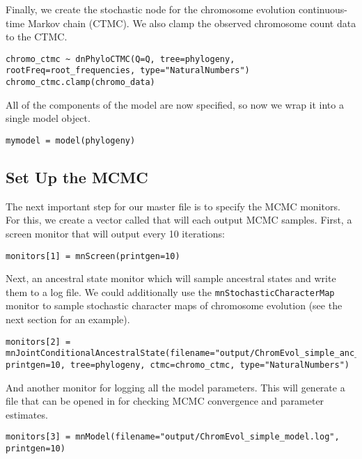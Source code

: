 Finally, we
create the stochastic node for the chromosome evolution continuous-time Markov chain (CTMC).
We also clamp the observed chromosome count data to the CTMC.
{\tt \begin{snugshade*}
\begin{lstlisting}
chromo_ctmc ~ dnPhyloCTMC(Q=Q, tree=phylogeny, rootFreq=root_frequencies, type="NaturalNumbers")
chromo_ctmc.clamp(chromo_data)
\end{lstlisting}
\end{snugshade*}}

All of the components of the model are now specified,
so now we wrap it into a single model object.
{\tt \begin{snugshade*}
\begin{lstlisting}
mymodel = model(phylogeny)
\end{lstlisting}
\end{snugshade*}}


\subsection{Set Up the MCMC}\label{subsect:Exercise-CompleteMCMC}


The next important step for our master \Rev file is to specify the MCMC monitors.
For this, we create a vector called  that will each output MCMC samples. 
First, a screen monitor that will output every 10 iterations:
{\tt \begin{snugshade*}
\begin{lstlisting}
monitors[1] = mnScreen(printgen=10)
\end{lstlisting}
\end{snugshade*}}

Next, an ancestral state monitor which will sample ancestral states and write them to a log file.
We could additionally use the \texttt{mnStochasticCharacterMap} monitor to sample
stochastic character maps of chromosome evolution (see the next section for an example).
{\tt \begin{snugshade*}
\begin{lstlisting}
monitors[2] = mnJointConditionalAncestralState(filename="output/ChromEvol_simple_anc_states.log", printgen=10, tree=phylogeny, ctmc=chromo_ctmc, type="NaturalNumbers")
\end{lstlisting}
\end{snugshade*}}

And another monitor for logging all the model parameters. This will generate a file that can be opened in \Tracer for checking MCMC convergence and parameter estimates.
{\tt \begin{snugshade*}
\begin{lstlisting}
monitors[3] = mnModel(filename="output/ChromEvol_simple_model.log", printgen=10)
\end{lstlisting}
\end{snugshade*}}

